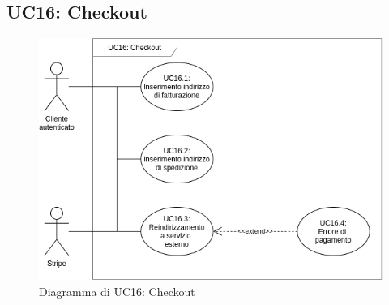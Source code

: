         \subsection{UC16: Checkout}
            \begin{figure}[!ht]
                \caption{Diagramma di UC16: Checkout}
                \vspace{10px}
                \includegraphics[scale=0.5]{../../../Images/AnalisiRequisiti/UC16}
                \centering
            \end{figure}
